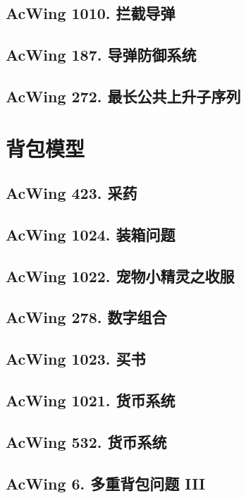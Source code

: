 \subsection{AcWing 1010. 拦截导弹}

\subsection{AcWing 187. 导弹防御系统}

\subsection{AcWing 272. 最长公共上升子序列}


\section{背包模型}

\subsection{AcWing 423. 采药}

\subsection{AcWing 1024. 装箱问题}

\subsection{AcWing 1022. 宠物小精灵之收服}

\subsection{AcWing 278. 数字组合}

\subsection{AcWing 1023. 买书}

\subsection{AcWing 1021. 货币系统}

\subsection{AcWing 532. 货币系统}

\subsection{AcWing 6. 多重背包问题 III}

